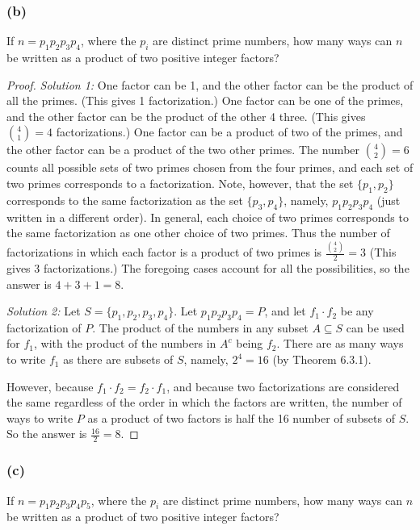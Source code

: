 \documentclass[14pt]{extarticle}
\newcommand{\dps}{\displaystyle}
\begin{document}
\subsubsection{(b)}
If \(n = p_1 p_2 p_3 p_4\), where the \(p_i\) are distinct prime numbers, how many ways can \(n\) be written as a
product of two positive integer factors?

\begin{proof}
     {\it Solution 1:} One factor can be 1, and the other factor can be the product of all the primes. (This gives 1
     factorization.) One factor can be one of the primes, and the other factor can be the product of the other 4 three. (This
     gives \(\binom{4}{1} = 4\) factorizations.) One factor can be a product of two of the primes, and the other factor can be a
     product of the two other primes. The number \(\binom{4}{2} = 6\) counts all possible sets of two primes chosen from the
     four primes, and each set of two primes corresponds to a factorization. Note, however, that the set \(\{p_1, p_2\}\)
     corresponds to the same factorization as the set \(\{p_3, p_4\}\), namely, \(p_1 p_2 p_3 p_4\) (just written in a
     different order). In general, each choice of two primes corresponds to the same factorization as one other choice of
     two primes. Thus the number of factorizations in which each factor is a product of two primes is \(\dps\frac{\binom{4}{2}}
     {2} = 3\) (This gives 3 factorizations.) The foregoing cases account for all the possibilities, so the answer is
     \(4 + 3 + 1 = 8\).

          {\it Solution 2:} Let \(S = \{p_1, p_2, p_3, p_4\}\). Let \(p_1 p_2 p_3 p_4 = P\), and let \(f_1 \cdot f_2\) be any
     factorization of \(P\). The product of the numbers in any subset \(A \subseteq S\) can be used for \(f_1\), with the
     product of the numbers in \(A^c\) being \(f_2\). There are as many ways to write \(f_1\) as there are subsets of \(S\),
     namely, \(2^4 = 16\) (by Theorem 6.3.1).

     However, because \(f_1 \cdot f_2 = f_2 \cdot f_1\), and because two factorizations are considered the same regardless of the
     order in which the factors are written, the number of ways to write \(P\) as a product of two factors is half the 16 number
     of subsets of \(S\). So the answer is \(\frac{16}{2} = 8\).
\end{proof}

\subsubsection{(c)}
If \(n = p_1 p_2 p_3 p_4 p_5\), where the \(p_i\) are distinct prime numbers, how many ways can \(n\) be written
as a product of two positive integer factors?
\end{document}
